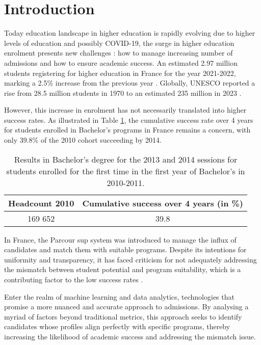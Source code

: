 \documentclass[conference]{IEEEtran}
\begin{document}
\section{Introduction}
Today education landscape in higher education is rapidly evolving due to higher levels of education and possibly COVID-19, the surge in higher education enrolment presents new challenges : how to manage increasing number of admissions and how to ensure academic success. 
An estimated 2.97 million students registering for higher education in France for the year 2021-2022, marking a 2.5\% increase from the previous year \cite{sous-direction_des_systemes_dinformation_et_des_etudes_statistiques_sies_les_2022}. Globally, UNESCO reported a rise from 28.5 million students in 1970 to an estimated 235 million in 2023 \cite{unesco_higher_2023}.

However, this increase in enrolment has not necessarily translated into higher success rates. As illustrated in Table \ref{tab:result_bachelor}, the cumulative success rate over 4 years for students enrolled in Bachelor's programs in France remains a concern, with only 39.8\% of the 2010 cohort succeeding by 2014.

\begin{table}[H]
    \centering
    \caption{Results in Bachelor's degree for the 2013 and 2014 sessions for students enrolled for the first time in the first year of Bachelor's in 2010-2011.\cite{kabla-langlois_fporsoc16b_ec2_enseignementpdf_2016}}
    \begin{tabular}{|c|c|}
        \hline
        \textbf{Headcount 2010} & \textbf{Cumulative success over 4 years (in \%)}\\
        \hline
        169 652 & 39.8 \\
        \hline
    \end{tabular}
    \label{tab:result_bachelor}
\end{table}

In France, the Parcour sup system was introduced to manage the influx of candidates and match them with suitable programs. Despite its intentions for uniformity and transparency, it has faced criticism for not adequately addressing the mismatch between student potential and program suitability, which is a contributing factor to the low success rates \cite{couto_parcoursup_2021}.

Enter the realm of machine learning and data analytics, technologies that promise a more nuanced and accurate approach to admissions. By analysing a myriad of factors beyond traditional metrics, this approach seeks to identify candidates whose profiles align perfectly with specific programs, thereby increasing the likelihood of academic success and addressing the mismatch issue.
\end{document}
